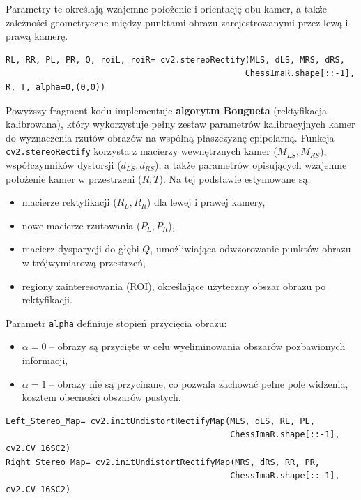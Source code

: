 \documentclass[magisterska]{pracadypl}
\begin{document}
Parametry te określają wzajemne położenie i orientację obu kamer, a także zależności geometryczne między punktami obrazu zarejestrowanymi przez lewą i prawą kamerę.

\begin{lstlisting}[style=mypython]
RL, RR, PL, PR, Q, roiL, roiR= cv2.stereoRectify(MLS, dLS, MRS, dRS, 
                                                ChessImaR.shape[::-1], R, T, alpha=0,(0,0))  
\end{lstlisting}

Powyższy fragment kodu implementuje \textbf{algorytm Bougueta} (rektyfikacja kalibrowana), który wykorzystuje pełny zestaw parametrów kalibracyjnych kamer do wyznaczenia rzutów obrazów na wspólną płaszczyznę epipolarną. 
Funkcja \texttt{cv2.stereoRectify} korzysta z macierzy wewnętrznych kamer ($M_{LS}, M_{RS}$), współczynników dystorsji ($d_{LS}, d_{RS}$), a także parametrów opisujących wzajemne położenie kamer w przestrzeni ($R,T$). 
Na tej podstawie estymowane są:

\begin{itemize}
    \item macierze rektyfikacji ($R_L,R_R$) dla lewej i prawej kamery,
    \item nowe macierze rzutowania ($P_L,P_R$),
    \item macierz dysparycji do głębi $Q$, umożliwiająca odwzorowanie punktów obrazu w trójwymiarową przestrzeń,
    \item regiony zainteresowania (ROI), określające użyteczny obszar obrazu po rektyfikacji.
\end{itemize}

Parametr \texttt{alpha} definiuje stopień przycięcia obrazu:

\begin{itemize}
    \item $\alpha = 0$ – obrazy są przycięte w celu wyeliminowania obszarów pozbawionych informacji,
    \item $\alpha = 1$ – obrazy nie są przycinane, co pozwala zachować pełne pole widzenia, kosztem obecności obszarów pustych.
\end{itemize}

\begin{lstlisting}[style=mypython]
Left_Stereo_Map= cv2.initUndistortRectifyMap(MLS, dLS, RL, PL,
                                             ChessImaR.shape[::-1], cv2.CV_16SC2)
Right_Stereo_Map= cv2.initUndistortRectifyMap(MRS, dRS, RR, PR,
                                             ChessImaR.shape[::-1], cv2.CV_16SC2)
\end{lstlisting}
\end{document}
